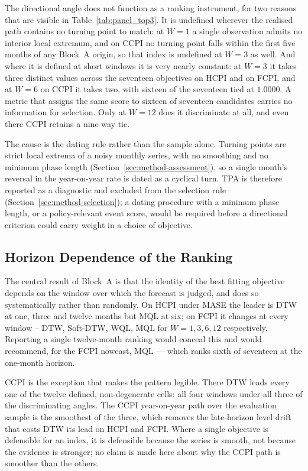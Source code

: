 \documentclass[12pt]{article}
\begin{document}
The directional angle does not function as a ranking instrument, for two
reasons that are visible in Table~\ref{tab:panel_top3}. It is undefined
wherever the realised path contains no turning point to match: at $W=1$ a
single observation admits no interior local extremum, and on CCPI no turning
point falls within the first five months of any Block~A origin, so that index
is undefined at $W=3$ as well. And where it is defined at short windows it is
very nearly constant: at $W=3$ it takes three distinct values across the
seventeen objectives on HCPI and on FCPI, and at $W=6$ on CCPI it takes two,
with sixteen of the seventeen tied at $1.0000$. A metric that assigns the same
score to sixteen of seventeen candidates carries no information for selection.
Only at $W=12$ does it discriminate at all, and even there CCPI retains a
nine-way tie.

The cause is the dating rule rather than the sample alone. Turning points are
strict local extrema of a noisy monthly series, with no smoothing and no
minimum phase length (Section~\ref{sec:method-assessment}), so a single
month's reversal in the year-on-year rate is dated as a cyclical turn. TPA is
therefore reported as a diagnostic and excluded from the selection rule
(Section~\ref{sec:method-selection}); a dating procedure with a minimum phase
length, or a policy-relevant event score, would be required before a
directional criterion could carry weight in a choice of objective.

\subsection{Horizon Dependence of the Ranking}
\label{sec:res-horizon}

The central result of Block~A is that the identity of the best fitting
objective depends on the window over which the forecast is judged, and does so
systematically rather than randomly. On HCPI under MASE the leader is DTW at
one, three and twelve months but MQL at six; on FCPI it changes at every window
-- DTW, Soft-DTW, WQL, MQL for $W=1,3,6,12$ respectively. Reporting a single
twelve-month ranking would conceal this and would recommend, for the FCPI
nowcast, MQL --- which ranks sixth of seventeen at the one-month horizon.

CCPI is the exception that makes the pattern legible. There DTW leads every one
of the twelve defined, non-degenerate cells: all four windows under all three
of the discriminating angles. The CCPI year-on-year path over the evaluation sample is
the smoothest of the three, which removes the late-horizon level drift that
costs DTW its lead on HCPI and FCPI. Where a single objective is defensible for
an index, it is defensible because the series is smooth, not because the
evidence is stronger; no claim is made here about why the CCPI path is smoother
than the others.
\end{document}

